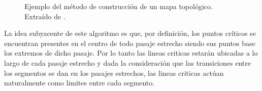 \begin{figure}[H]
  \centering
  \qquad
  \qquad
  \qquad
  \caption{Ejemplo del método de construcción de un mapa topológico. Extraído de \cite{Thrun1998}.}\label{fig:ejThrunTop}
\end{figure}

La idea subyacente de este algoritmo es que, por definición, los puntos críticos se encuentran presentes en el centro de todo pasaje estrecho siendo sus puntos base los extremos de dicho pasaje. Por lo tanto las lineas criticas estarán ubicadas a lo largo de cada pasaje estrecho y dada la consideración que las transiciones entre los segmentos se dan en los pasajes estrechos, las lineas criticas actúan naturalmente como limites entre cada segmento.

